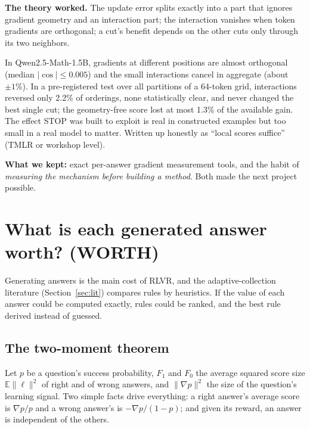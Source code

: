 \documentclass[11pt]{article}
\newcommand{\E}{\mathbb{E}}
\begin{document}
\textbf{The theory worked.} The update error splits exactly into a part that ignores gradient geometry and an interaction part; the interaction vanishes when token gradients are orthogonal; a cut's benefit depends on the other cuts only through its two neighbors.

\begin{found}
In Qwen2.5-Math-1.5B, gradients at different positions are almost orthogonal (median $|\cos|\le0.005$) and the small interactions cancel in aggregate (about $\pm1\%$). In a pre-registered test over all partitions of a 64-token grid, interactions reversed only 2.2\% of orderings, none statistically clear, and never changed the best single cut; the geometry-free score lost at most 1.3\% of the available gain. The effect STOP was built to exploit is real in constructed examples but too small in a real model to matter. Written up honestly as ``local scores suffice'' (TMLR or workshop level).
\end{found}

\textbf{What we kept:} exact per-answer gradient measurement tools, and the habit of \emph{measuring the mechanism before building a method}. Both made the next project possible.

\section{What is each generated answer worth? (WORTH)}\label{sec:worth}

\begin{why}
Generating answers is the main cost of RLVR, and the adaptive-collection literature (Section~\ref{sec:lit}) compares rules by heuristics. If the value of each answer could be computed exactly, rules could be ranked, and the best rule derived instead of guessed.
\end{why}

\subsection{The two-moment theorem}
Let $p$ be a question's success probability, $F_1$ and $F_0$ the average squared score size $\E\|\ell\|^2$ of right and of wrong answers, and $\|\nabla p\|^2$ the size of the question's learning signal. Two simple facts drive everything: a right answer's average score is $\nabla p/p$ and a wrong answer's is $-\nabla p/(1-p)$; and given its reward, an answer is independent of the others.
\end{document}
